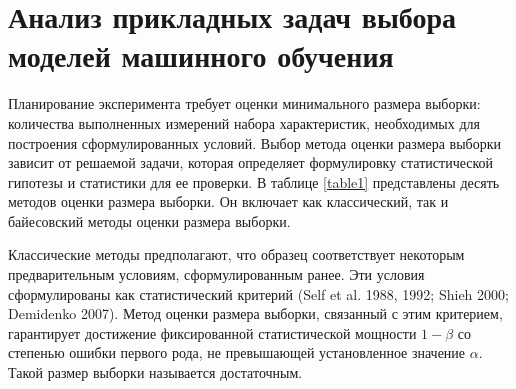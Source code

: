 \chapter{Анализ прикладных задач выбора моделей машинного обучения}
Планирование эксперимента требует оценки минимального размера выборки: количества выполненных измерений набора характеристик, необходимых для построения сформулированных условий. Выбор метода оценки размера выборки зависит от решаемой задачи, которая определяет формулировку статистической гипотезы и статистики для ее проверки. В таблице \ref{table1} представлены десять методов оценки размера выборки. Он включает как классический, так и байесовский методы оценки размера выборки.

Классические методы предполагают, что образец соответствует некоторым предварительным условиям, сформулированным ранее. Эти условия сформулированы как статистический критерий (Self et al. 1988, 1992; Shieh 2000; Demidenko 2007). Метод оценки размера выборки, связанный с этим критерием, гарантирует достижение фиксированной статистической мощности $1-\beta$ со степенью ошибки первого рода, не превышающей установленное значение $\alpha$. Такой размер выборки называется достаточным.


